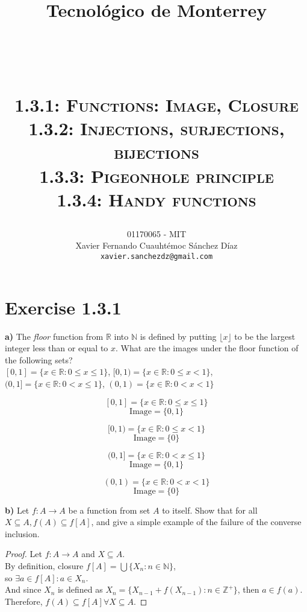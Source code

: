 \documentclass[titlepage, letterpaper, fleqn]{article}
\title{
\vspace{1in}
\textbf{Tecnológico de Monterrey} \\
\vspace{0.5in}
\textmd{\mahclass} \\
\large{\textit{\mahteacher}} \\
\vspace{0.5in}
\textsc{\mahtitle}\\
\textsc{1.3.1: Functions: Image, Closure}\\
\textsc{1.3.2: Injections, surjections, bijections}\\
\textsc{1.3.3: Pigeonhole principle}\\
\textsc{1.3.4: Handy functions}\\
\author{01170065  - MIT \\
Xavier Fernando Cuauhtémoc Sánchez Díaz \\
\texttt{xavier.sanchezdz@gmail.com}}
\date{\mahdate}
}
\newcommand{\spacepls}{\vspace{5mm}}
\begin{document}
\begin{titlepage}
\maketitle
\end{titlepage}

%
%

\section{Exercise 1.3.1}

{\large \textbf{a)} The \textit{floor} function from \(\mathbb{R}\) into \(\mathbb{N}\) is defined by putting \(\lfloor x \rfloor\) to be the largest integer less than or equal to \(x\).
What are the images under the floor function of the following sets?}\\
\([0,1] = \{x \in \mathbb{R} \colon 0 \leq x \leq 1\}\), \([0,1) = \{x \in \mathbb{R} \colon 0 \leq x < 1\}\),\\
\((0,1] = \{x \in \mathbb{R} \colon 0 < x \leq 1\}\), \((0,1) = \{x \in \mathbb{R} \colon 0 < x < 1\}\)

\[[0,1] = \{x \in \mathbb{R} \colon 0 \leq x \leq 1\}\]
\[\text{Image} = \{0,1\}\]

\[[0,1) = \{x \in \mathbb{R} \colon 0 \leq x < 1\}\]
\[\text{Image} = \{0\}\]

\[(0,1] = \{x \in \mathbb{R} \colon 0 < x \leq 1\}\]
\[\text{Image} = \{0,1\}\]

\[(0,1) = \{x \in \mathbb{R} \colon 0 < x < 1\}\]
\[\text{Image} = \{0\}\]

\spacepls

{\large \textbf{b)} Let \(f\colon A \to A\) be a function from set \(A\) to itself. Show that for all \(X \subseteq A, f(A) \subseteq f[A]\), and give a simple example of the failure of the converse inclusion.}

\begin{proof}
Let \(f\colon A \to A\) and \(X \subseteq A\).\\
By definition, closure \(f[A] = \bigcup \{X_n \colon n \in \mathbb{N}\}\),\\
so \(\exists a \in f[A] \colon a \in X_n\).\\
And since \(X_n\) is defined as \(X_n = \{X_{n-1} + f(X_{n-1}) \colon n \in \mathbb{Z}^+\}\), then \(a \in f(a)\).\\
Therefore, \(f(A) \subseteq f[A] \forall X \subseteq A\).
\end{proof}
\end{document}
